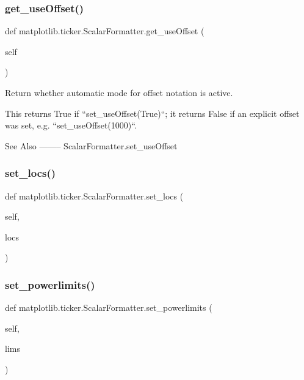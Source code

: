 \subsubsection{\texorpdfstring{get\+\_\+use\+Offset()}{get\_useOffset()}}
{\footnotesize\ttfamily def matplotlib.\+ticker.\+Scalar\+Formatter.\+get\+\_\+use\+Offset (\begin{DoxyParamCaption}\item[{}]{self }\end{DoxyParamCaption})}

\begin{DoxyVerb}Return whether automatic mode for offset notation is active.

This returns True if ``set_useOffset(True)``; it returns False if an
explicit offset was set, e.g. ``set_useOffset(1000)``.

See Also
--------
ScalarFormatter.set_useOffset
\end{DoxyVerb}
 \mbox{\label{classmatplotlib_1_1ticker_1_1ScalarFormatter_aaff41b6bcfcfbd1a3480bb187113ef66}} 
\subsubsection{\texorpdfstring{set\+\_\+locs()}{set\_locs()}}
{\footnotesize\ttfamily def matplotlib.\+ticker.\+Scalar\+Formatter.\+set\+\_\+locs (\begin{DoxyParamCaption}\item[{}]{self,  }\item[{}]{locs }\end{DoxyParamCaption})}

\mbox{\label{classmatplotlib_1_1ticker_1_1ScalarFormatter_a0462a97f0a87ed665f690d660654a744}} 
\subsubsection{\texorpdfstring{set\+\_\+powerlimits()}{set\_powerlimits()}}
{\footnotesize\ttfamily def matplotlib.\+ticker.\+Scalar\+Formatter.\+set\+\_\+powerlimits (\begin{DoxyParamCaption}\item[{}]{self,  }\item[{}]{lims }\end{DoxyParamCaption})}

